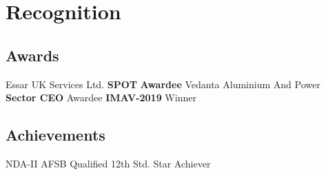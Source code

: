 \documentclass[]{deedy-resume-openfont}
\begin{document}
\begin{minipage}[t]{0.30\textwidth}




\section{Recognition}
\subsection{Awards}
\textbullet{} Essar UK Services Ltd. \newline  \textbf{SPOT} \textbf{Awardee}
\newline
\textbullet{} Vedanta Aluminium And Power \newline  \textbf{Sector CEO} Awardee
\newline
\textbullet{}  \textbf{IMAV-2019} Winner
\sectionsep

\subsection{Achievements}
\textbullet{} NDA-II AFSB Qualified
\newline
\textbullet{} 12th Std. Star Achiever

\sectionsep


%
%

\end{minipage}
\hfill
\end{document}
